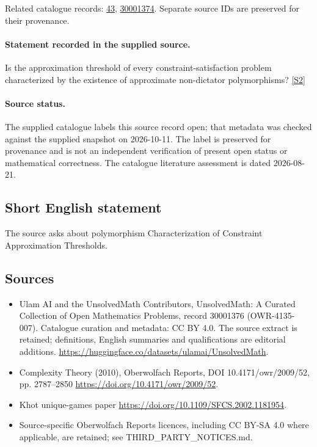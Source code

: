 \documentclass[11pt]{article}
\begin{document}
Related catalogue records: \href{https://mehmetmars7.github.io/Erdosproblems-llm-hunter/problem.html?type=open_problems&id=43}{43}, \href{https://mehmetmars7.github.io/Erdosproblems-llm-hunter/problem.html?type=open_problems&id=30001374}{30001374}. Separate source IDs are preserved for their provenance.
\paragraph{Statement recorded in the supplied source.}
Is the approximation threshold of every constraint-satisfaction problem characterized by the existence of approximate non-dictator polymorphisms? \href{https://doi.org/10.4171/owr/2009/52}{[S2]}
\paragraph{Source status.}
The supplied catalogue labels this source record open; that metadata was checked against the supplied snapshot on 2026-10-11. The label is preserved for provenance and is not an independent verification of present open status or mathematical correctness. The catalogue literature assessment is dated 2026-08-21.
\subsection{Short English statement}
The source asks about polymorphism Characterization of Constraint Approximation Thresholds.
\subsection{Sources}
\begin{itemize}
\item[S1] Ulam AI and the UnsolvedMath Contributors, UnsolvedMath: A Curated Collection of Open Mathematics Problems, record 30001376 (OWR-4135-007). Catalogue curation and metadata: CC BY 4.0. The source extract is retained; definitions, English summaries and qualifications are editorial additions.
\url{https://huggingface.co/datasets/ulamai/UnsolvedMath}.
\item[S2] Complexity Theory (2010), Oberwolfach Reports, DOI 10.4171/owr/2009/52, pp. 2787--2850
\url{https://doi.org/10.4171/owr/2009/52}.
\item[S3] Khot unique-games paper
\url{https://doi.org/10.1109/SFCS.2002.1181954}.
\item Source-specific Oberwolfach Reports licences, including CC BY-SA 4.0 where applicable, are retained; see THIRD\_PARTY\_NOTICES.md.
\end{itemize}
\end{document}
